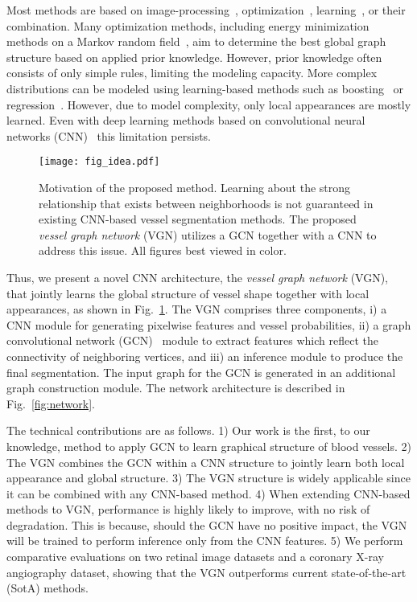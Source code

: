 \documentclass[runningheads,a4paper]{llncs}
\begin{document}
Most methods are based on image-processing~\cite{soares06}, optimization~\cite{orlando14,shin16}, learning~\cite{becker13,sironi15}, or their combination. Many optimization methods, including energy minimization methods on a Markov random field~\cite{orlando14,shin16}, aim to determine the best global graph structure based on applied prior knowledge. However, prior knowledge often consists of only simple rules, limiting the modeling capacity. More complex distributions can be modeled using learning-based methods such as boosting~\cite{becker13} or regression~\cite{sironi15}. However, due to model complexity, only local appearances are mostly learned. Even with deep learning methods based on convolutional neural networks (CNN)~\cite{ganin14,fu16,maninis16} this limitation persists.

\begin{figure}
	\centering
	\texttt{[image: fig\_idea.pdf]}
	\caption{Motivation of the proposed method. Learning about the strong relationship that exists between neighborhoods is not guaranteed in existing CNN-based vessel segmentation methods. The proposed {\em vessel graph network} (VGN) utilizes a GCN together with a CNN to address this issue. All figures best viewed in color.}
	\label{fig:idea}
\end{figure}

Thus, we present a novel CNN architecture, the {\em vessel graph network} (VGN), that jointly learns the global structure of vessel shape together with local appearances, as shown in Fig.~\ref{fig:idea}. The VGN comprises three components, i) a CNN module for generating pixelwise features and vessel probabilities, ii) a graph convolutional network (GCN)~\cite{kipf17} module to extract features which reflect the connectivity of neighboring vertices, and iii) an inference module to produce the final segmentation. The input graph for the GCN is generated in an additional graph construction module. The network architecture is described in Fig.~\ref{fig:network}. 

The technical contributions are as follows. 1) Our work is the first, to our knowledge, method to apply GCN to learn graphical structure of blood vessels. 2) The VGN combines the GCN within a CNN structure to jointly learn both local appearance and global structure. 3) The VGN structure is widely applicable since it can be combined with any CNN-based method. 4) When extending CNN-based methods to VGN, performance is highly likely to improve, with no risk of degradation. This is because, should the GCN have no positive impact, the VGN will be trained to perform inference only from the CNN features. 5) We perform comparative evaluations on two retinal image datasets and a coronary X-ray angiography dataset, showing that the VGN outperforms current state-of-the-art (SotA) methods. 
\end{document}
